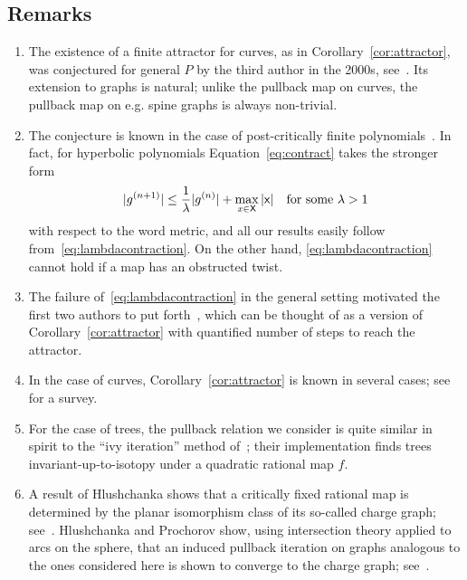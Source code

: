 \documentclass{amsart}
\theoremstyle{definition}
\theoremstyle{remark}
\newcommand{\sfX}{{\sf X}}
\newcommand{\sfx}{{\sf x}}
\begin{document}
\subsection*{Remarks}
\begin{enumerate}
\item The existence of a finite attractor for curves, as in Corollary~\ref{cor:attractor}, was conjectured for general $P$ by the third author in the 2000s, see~\cite{kmp:tw:published}. Its extension to graphs is natural; unlike the pullback map on curves, the pullback map on e.g. spine graphs is always non-trivial.

\item The conjecture is known in the case of post-critically finite polynomials~\cite{MR3199801,MR4510015}. In fact, for hyperbolic polynomials Equation~\eqref{eq:contract} takes the stronger form
  \begin{equation}\label{eq:lambdacontraction}
    |g^{(n+1)}|\le\frac1\lambda|g^{(n)}|+\max_{x\in\sfX}|\sfx|\quad\text{for some }\lambda>1
  \end{equation}
  with respect to the word metric, and all our results easily follow from~\eqref{eq:lambdacontraction}. On the other hand, \eqref{eq:lambdacontraction} cannot hold if a map has an obstructed twist.\label{rem:2}

\item The failure of~\eqref{eq:lambdacontraction} in the general setting motivated the first two authors to put forth~\cite[Conjecture~7.10]{MR4213769}, which can be thought of as a version of Corollary~\ref{cor:attractor} with quantified number of steps to reach the attractor.
  
\item In the case of curves, Corollary~\ref{cor:attractor} is known in several cases; see~\cite{MR4472056} for a survey. 

\item For the case of trees, the pullback relation we consider is quite similar in spirit to the ``ivy iteration'' method of~\cite{MR4068871}; their implementation finds trees invariant-up-to-isotopy under a quadratic rational map $f$.  

\item A result of Hlushchanka shows that a critically fixed rational map is determined by the planar isomorphism class of its so-called charge graph; see~\cite{Hlushchanka:2019aa}. Hlushchanka and Prochorov show, using intersection theory applied to arcs on the sphere, that an induced  pullback iteration on graphs analogous to the ones considered here is shown to converge  to the charge graph; see~\cite{Hlushchanka:2022aa}.


\end{enumerate}
\end{document}
